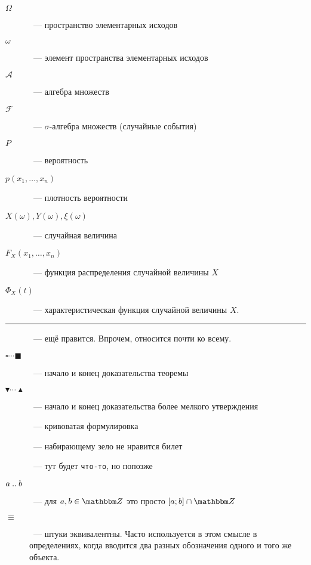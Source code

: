 \documentclass[12pt]{../../notes}
\begin{document}
\begin{description}
  \item[$\Omega$]~--- пространство элементарных исходов
  \item[$\omega$]~--- элемент пространства элементарных исходов
  \item[$\mathcal A$]~--- алгебра множеств 
  \item[$\mathcal F$]~--- $\sigma$-алгебра множеств (случайные события)
  \item[$P$]~--- вероятность
  \item[$p(x_1, \dotsc, x_n)$]~--- плотность вероятности
  \item[$X(\omega), Y(\omega), \xi(\omega)$]~--- случайная величина
  \item[$F_X(x_1, \dotsc, x_n)$]~--- функция распределения случайной величины $X$
  \item[$\Phi_X(t)$]~--- характеристическая функция случайной величины $X$.
\end{description}

\noindent\rule{\textwidth}{0.01em}

\begin{description}
  \item[\underdev]~--- ещё правится. Впрочем, относится почти ко всему.
  \item[$\square\cdots\blacksquare$]~--- начало и конец доказательства теоремы
  \item[$\blacktriangledown\cdots\blacktriangle$]~--- начало и конец доказательства более мелкого 
    утверждения
  \item[\sour]~--- кривоватая формулировка
  \item[\flame]~--- набирающему зело не нравится билет
  \item[]~--- тут будет \texttt{что-то}, но попозже
  \item[$a\mathbin{..} b$]~--- для $a,b \in \Z$ это просто $[a;b]\cap \Z$
  \item[$\equiv$]~--- штуки эквивалентны. Часто используется в этом смысле в определениях, когда вводится
    два разных обозначения одного и того же объекта.
\end{description}
\end{document}
